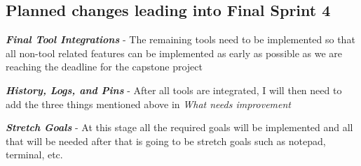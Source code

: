 \documentclass{article}
\begin{document}
\subsection{Planned changes leading into Final Sprint 4}
\begin{center}
    \textbf{\textit{Final Tool Integrations}} - The remaining tools need to be implemented so that all non-tool related features can be implemented as early as possible as we are reaching the deadline for the capstone project 
\end{center}
\begin{center}
    \textbf{\textit{History, Logs, and Pins}} - After all tools are integrated, I will then need to add the three things mentioned above in \textit{What needs improvement}
\end{center}
\begin{center}
    \textbf{\textit{Stretch Goals}} - At this stage all the required goals will be implemented and all that will be needed after that is going to be stretch goals such as notepad, terminal, etc.
\end{center}
\end{document}
